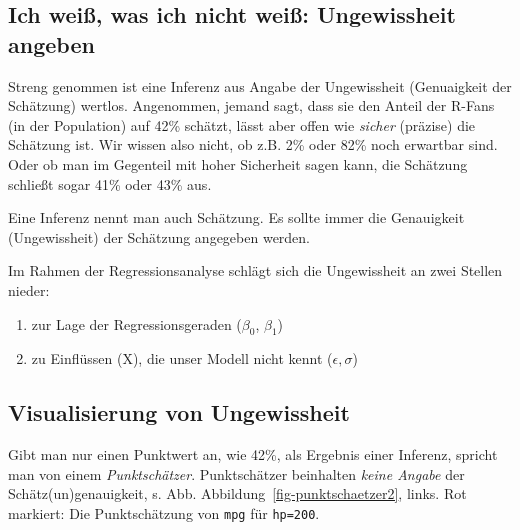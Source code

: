 \documentclass[
  a4paper,
  DIV=11]{scrreprt}
\providecommand{\tightlist}{%
  \setlength{\itemsep}{0pt}\setlength{\parskip}{0pt}}\usepackage{longtable,booktabs,array}
\theoremstyle{definition}
\theoremstyle{remark}
\begin{document}
\hypertarget{ich-weiuxdf-was-ich-nicht-weiuxdf-ungewissheit-angeben}{%
\subsection{Ich weiß, was ich nicht weiß: Ungewissheit
angeben}\label{ich-weiuxdf-was-ich-nicht-weiuxdf-ungewissheit-angeben}}

Streng genommen ist eine Inferenz aus Angabe der Ungewissheit
(Genuaigkeit der Schätzung) wertlos. Angenommen, jemand sagt, dass sie
den Anteil der R-Fans (in der Population) auf 42\% schätzt, lässt aber
offen wie \emph{sicher} (präzise) die Schätzung ist. Wir wissen also
nicht, ob z.B. 2\% oder 82\% noch erwartbar sind. Oder ob man im
Gegenteil mit hoher Sicherheit sagen kann, die Schätzung schließt sogar
41\% oder 43\% aus.

\begin{tcolorbox}[enhanced jigsaw, leftrule=.75mm, left=2mm, bottomrule=.15mm, opacityback=0, coltitle=black, colbacktitle=quarto-callout-important-color!10!white, opacitybacktitle=0.6, rightrule=.15mm, toptitle=1mm, colback=white, colframe=quarto-callout-important-color-frame, arc=.35mm, toprule=.15mm, breakable, titlerule=0mm, bottomtitle=1mm, title=\textcolor{quarto-callout-important-color}{\faExclamation}\hspace{0.5em}{Wichtig}]
Eine Inferenz nennt man auch Schätzung. Es sollte immer die Genauigkeit
(Ungewissheit) der Schätzung angegeben werden.
\end{tcolorbox}

Im Rahmen der Regressionsanalyse schlägt sich die Ungewissheit an zwei
Stellen nieder:

\begin{enumerate}
\def\labelenumi{\arabic{enumi}.}
\tightlist
\item
  zur Lage der Regressionsgeraden (\(\beta_0\), \(\beta_1\))
\item
  zu Einflüssen (X), die unser Modell nicht kennt (\(\epsilon, \sigma\))
\end{enumerate}

\hypertarget{visualisierung-von-ungewissheit}{%
\subsection{Visualisierung von
Ungewissheit}\label{visualisierung-von-ungewissheit}}

Gibt man nur einen Punktwert an, wie 42\%, als Ergebnis einer Inferenz,
spricht man von einem \emph{Punktschätzer}. Punktschätzer beinhalten
\emph{keine Angabe} der Schätz(un)genauigkeit, s. Abb.
Abbildung~\ref{fig-punktschaetzer2}, links. Rot markiert: Die
Punktschätzung von \texttt{mpg} für \texttt{hp=200}.
\end{document}
